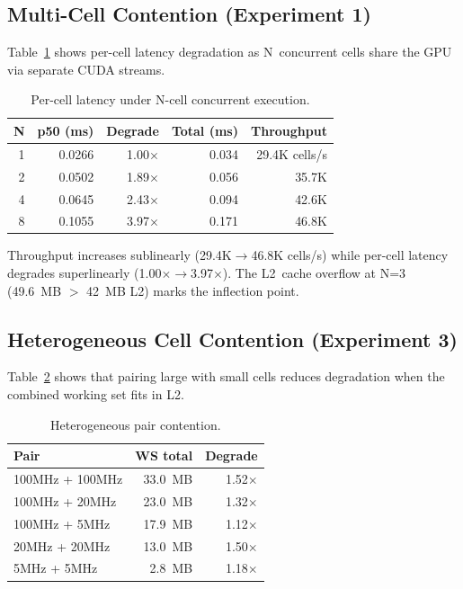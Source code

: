 \subsection{Multi-Cell Contention (Experiment 1)}

Table~\ref{tab:eval_contention} shows per-cell latency degradation as N~concurrent cells share the GPU via separate CUDA streams.

\begin{table}[h]
\centering
\small
\caption{Per-cell latency under N-cell concurrent execution.}
\label{tab:eval_contention}
\begin{tabular}{@{}rrrrr@{}}
\toprule
N & p50 (ms) & Degrade & Total (ms) & Throughput \\
\midrule
1 & 0.0266 & 1.00$\times$ & 0.034 & 29.4K cells/s \\
2 & 0.0502 & 1.89$\times$ & 0.056 & 35.7K \\
4 & 0.0645 & 2.43$\times$ & 0.094 & 42.6K \\
8 & 0.1055 & 3.97$\times$ & 0.171 & 46.8K \\
\bottomrule
\end{tabular}
\end{table}

Throughput increases sublinearly (29.4K$\rightarrow$46.8K cells/s) while per-cell latency degrades superlinearly (1.00$\times$$\rightarrow$3.97$\times$). The L2~cache overflow at N=3 (49.6~MB $>$ 42~MB L2) marks the inflection point.

\subsection{Heterogeneous Cell Contention (Experiment 3)}

Table~\ref{tab:eval_hetero} shows that pairing large with small cells reduces degradation when the combined working set fits in L2.

\begin{table}[h]
\centering
\small
\caption{Heterogeneous pair contention.}
\label{tab:eval_hetero}
\begin{tabular}{@{}lrr@{}}
\toprule
Pair & WS total & Degrade \\
\midrule
100MHz + 100MHz & 33.0~MB & 1.52$\times$ \\
100MHz + 20MHz & 23.0~MB & 1.32$\times$ \\
100MHz + 5MHz & 17.9~MB & 1.12$\times$ \\
20MHz + 20MHz & 13.0~MB & 1.50$\times$ \\
5MHz + 5MHz & 2.8~MB & 1.18$\times$ \\
\bottomrule
\end{tabular}
\end{table}

